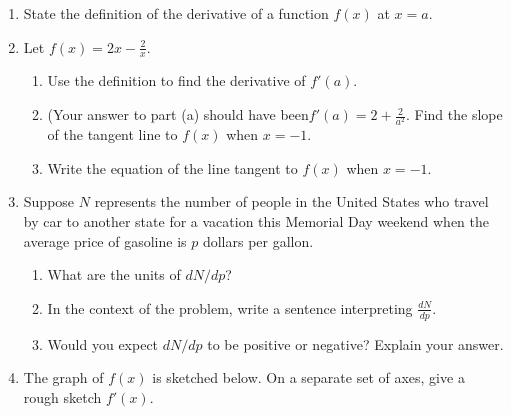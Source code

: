 \documentclass[12pt]{article}
\begin{document}
\begin{enumerate}

\item State the definition of the derivative of a function $f(x)$ at $x=a$.
\vspace{1in}

\item Let $f(x)=2x-\frac{2}{x}$.
	\begin{enumerate}
	\item Use the definition to find the derivative of $f'(a).$ 
	\vfill
	\item (Your answer to part (a) should have been$f'(a)=2+	\frac{2}{a^2}.$ Find the slope of the tangent line to $f(x)$ 	when $x=-1.$
	\vspace{1in}
	\item Write the equation of the line tangent to $f(x)$ when 	$x=-1.$
	\vspace{1in}
	\end{enumerate}

\newpage

\item Suppose $N$ represents the number of people in the United States who travel by car to another state for a vacation this Memorial Day weekend when the average price of gasoline is $p$ dollars per gallon. 
	\begin{enumerate}
	\item What are the units of $dN/dp$?\\
	\item In the context of the problem, write a sentence interpreting $\frac{dN}{dp}.$\\
	\vspace{0.5in}
	\item Would you expect $dN/dp$ to be positive or negative? Explain your answer.
	\vfill
	\end{enumerate}

\item The graph of $f(x)$ is sketched below. On a separate set of axes, give a rough sketch $f'(x).$\\



\end{enumerate}
\end{document}
